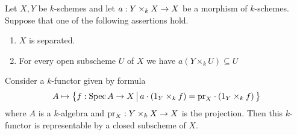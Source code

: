 \begin{lemma}\label{lemma:representability_of_fixed_point_functor}
Let $X,Y$ be $k$-schemes and let $a:Y\times_kX\rightarrow X$ be a morphism of $k$-schemes. Suppose that one of the following assertions hold.
\begin{enumerate}[label=\emph{\textbf{(\arabic*)}}, leftmargin=3.0em]
\item $X$ is separated.
\item For every open subscheme $U$ of $X$ we have $a\left(Y\times_kU\right)\subseteq U$
\end{enumerate}
Consider a $k$-functor given by formula
$$A \mapsto \big\{f:\mathrm{Spec}\, A\rightarrow X\,\big|\,a\cdot \left(1_Y\times_k f\right) = \mathrm{pr}_X\cdot \left(1_Y\times_kf\right)\big\}$$
where $A$ is a  $k$-algebra and $\mathrm{pr}_X:Y\times_kX \rightarrow X$ is the projection. Then this $k$-functor is representable by a closed subscheme of $X$.
\end{lemma}
